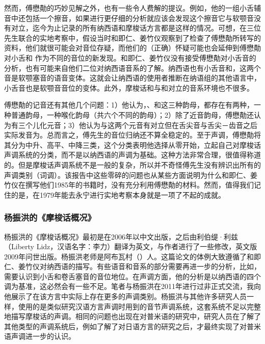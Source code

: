 然而，傅懋勣的巧妙见解之外，也有一些令人费解的提议。例如，他的一组小舌辅音中还包括一个擦音，如果进行更仔细的分析就应该会发现这个擦音它与软颚音没有对立，迄今为止记录的所有纳西语和摩梭话{方言}都是这样的情况。可想，在三位先生联合的实地考察中，假设当时和即仁、姜竹仪观察到了检查了傅懋勣所转写的资料，他们就很可能会对音位存疑，而他们的（正确）怀疑可能也会延伸到傅懋勣对小舌和 作为不同的音位的新发现。和即仁、姜竹仪没有接受傅懋勣对小舌音的分析，也有可能来自他们二位对纳西语音系的了解。纳西语也有小舌音和，这两个音是软颚塞音的语音变体。这就会让纳西语的使用者推断在纳语组的其他语言中，小舌音也是软颚音音位的变体。此外，摩梭话和与和对立的音系环境也不很多。

傅懋勣的记音还有其他几个问题：1）他认为，、和这三种韵母，都{存在}有两种，一种普通韵母，一种喉化韵母（共六个不同的韵母）；2）除了近音韵母，傅懋勣还认为有三个儿化元音；3）他认为与这两个元音有对立但在舌尖音与舌尖－齿音之后实际发音为。总而言之，傅先生的音位归纳还不算全稳定的。至于声调，傅懋勣将其分为中升、高平、中降三类，这个分类表明他选择从零开始，立起自己对摩梭话声调系统的分类，而不是以纳西语的声调为基础。这种方法非常合理，很值得称道的。但是摩梭话声调系统不是一般的复杂，所以并不奇怪傅先生没有辨识出所有的声调类别（词调）。该报告中这些零碎的问题也从某些方面说明为什么和即仁、姜竹仪在撰写他们1985年的书籍时，没有充分利用傅懋勣的材料。然而，值得我们记住的是，在1979年能去永宁进行实地考察本身就是一项了不起的成就。



\subsubsection{杨振洪的《摩梭话概况》}
\label{sec:yang2009}


杨振洪的《摩梭话概况》最初是在2006年以中文出版\parencite{yang2006d}，之后由利伯缇·利兹（Liberty Lidz，汉语名字：李力）翻译为英文，与作者进行了一些修改，英文版2009年问世出版\parencite{yang2009}。杨振洪老师是阿布瓦村（）人。这篇论文的体例大致遵循了和即仁、姜竹仪对{纳西语}的描写。有些语音和音系的部分需要再进一步的分析，比如，需要认识到小舌和卷舌塞音的音位地位。在声调方面，他的分析是以{纳西语}的四个调为基准，这必然会有一些不足。笔者与杨振洪在2011年进行过非正式交流，我向他展示了在该{方言}中实际上{存在}更多的声调类别。杨振洪与其他许多研究人员一样，使用的是类似研究汉语{方言}声调时用到的音节声调系统，这套系统不足以完整地描写摩梭话的声调。相同的问题也出现在对{普米语}的研究中，研究人员在了解了其他类型的声调系统后，例如了解了对{日语}{方言}的研究之后，才最终实现了对{普米语}声调进一步的认识\parencite{ding2001,ding2006,jacques2011a}。



